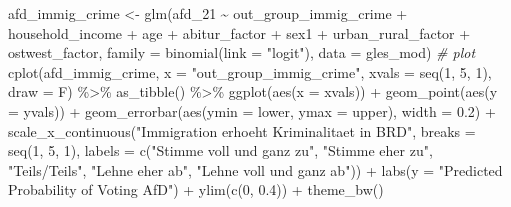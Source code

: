 \documentclass[
]{article}
\newenvironment{Shaded}{\begin{snugshade}}{\end{snugshade}}
\newcommand{\AttributeTok}[1]{\textcolor[rgb]{0.77,0.63,0.00}{#1}}
\newcommand{\CommentTok}[1]{\textcolor[rgb]{0.56,0.35,0.01}{\textit{#1}}}
\newcommand{\DecValTok}[1]{\textcolor[rgb]{0.00,0.00,0.81}{#1}}
\newcommand{\FloatTok}[1]{\textcolor[rgb]{0.00,0.00,0.81}{#1}}
\newcommand{\FunctionTok}[1]{\textcolor[rgb]{0.00,0.00,0.00}{#1}}
\newcommand{\NormalTok}[1]{#1}
\newcommand{\OtherTok}[1]{\textcolor[rgb]{0.56,0.35,0.01}{#1}}
\newcommand{\SpecialCharTok}[1]{\textcolor[rgb]{0.00,0.00,0.00}{#1}}
\newcommand{\StringTok}[1]{\textcolor[rgb]{0.31,0.60,0.02}{#1}}
\begin{document}
\begin{Shaded}
\begin{Highlighting}[]
\NormalTok{afd\_immig\_crime }\OtherTok{\textless{}{-}} \FunctionTok{glm}\NormalTok{(afd\_21 }\SpecialCharTok{\textasciitilde{}}\NormalTok{ out\_group\_immig\_crime }\SpecialCharTok{+}\NormalTok{ household\_income }\SpecialCharTok{+}\NormalTok{ age }\SpecialCharTok{+}\NormalTok{ abitur\_factor }\SpecialCharTok{+}\NormalTok{ sex1 }\SpecialCharTok{+}\NormalTok{ urban\_rural\_factor }\SpecialCharTok{+}\NormalTok{ ostwest\_factor, }\AttributeTok{family =} \FunctionTok{binomial}\NormalTok{(}\AttributeTok{link =} \StringTok{"logit"}\NormalTok{), }\AttributeTok{data =}\NormalTok{ gles\_mod)}
\CommentTok{\# plot }
\FunctionTok{cplot}\NormalTok{(afd\_immig\_crime, }\AttributeTok{x =} \StringTok{"out\_group\_immig\_crime"}\NormalTok{,}
      \AttributeTok{xvals =} \FunctionTok{seq}\NormalTok{(}\DecValTok{1}\NormalTok{, }\DecValTok{5}\NormalTok{, }\DecValTok{1}\NormalTok{), }\AttributeTok{draw =}\NormalTok{ F) }\SpecialCharTok{\%\textgreater{}\%}
  \FunctionTok{as\_tibble}\NormalTok{() }\SpecialCharTok{\%\textgreater{}\%}
  \FunctionTok{ggplot}\NormalTok{(}\FunctionTok{aes}\NormalTok{(}\AttributeTok{x =}\NormalTok{ xvals)) }\SpecialCharTok{+}
  \FunctionTok{geom\_point}\NormalTok{(}\FunctionTok{aes}\NormalTok{(}\AttributeTok{y =}\NormalTok{ yvals)) }\SpecialCharTok{+}
  \FunctionTok{geom\_errorbar}\NormalTok{(}\FunctionTok{aes}\NormalTok{(}\AttributeTok{ymin =}\NormalTok{ lower, }\AttributeTok{ymax =}\NormalTok{ upper), }\AttributeTok{width =} \FloatTok{0.2}\NormalTok{) }\SpecialCharTok{+}
  \FunctionTok{scale\_x\_continuous}\NormalTok{(}\StringTok{"Immigration erhoeht Kriminalitaet in BRD"}\NormalTok{, }
                     \AttributeTok{breaks =} \FunctionTok{seq}\NormalTok{(}\DecValTok{1}\NormalTok{, }\DecValTok{5}\NormalTok{, }\DecValTok{1}\NormalTok{), }
                     \AttributeTok{labels =} \FunctionTok{c}\NormalTok{(}\StringTok{"Stimme voll und ganz zu"}\NormalTok{, }\StringTok{"Stimme eher zu"}\NormalTok{, }
                                \StringTok{"Teils/Teils"}\NormalTok{, }\StringTok{"Lehne eher ab"}\NormalTok{, }
                                \StringTok{"Lehne voll und ganz ab"}\NormalTok{)) }\SpecialCharTok{+}
  \FunctionTok{labs}\NormalTok{(}\AttributeTok{y =} \StringTok{"Predicted Probability of Voting AfD"}\NormalTok{) }\SpecialCharTok{+}
  \FunctionTok{ylim}\NormalTok{(}\FunctionTok{c}\NormalTok{(}\DecValTok{0}\NormalTok{, }\FloatTok{0.4}\NormalTok{)) }\SpecialCharTok{+}
  \FunctionTok{theme\_bw}\NormalTok{() }
\end{Highlighting}
\end{Shaded}
\end{document}
